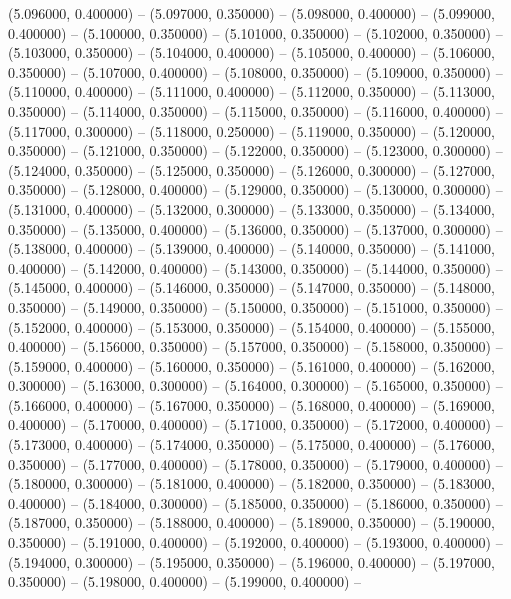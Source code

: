 (5.096000, 0.400000) -- 
(5.097000, 0.350000) -- 
(5.098000, 0.400000) -- 
(5.099000, 0.400000) -- 
(5.100000, 0.350000) -- 
(5.101000, 0.350000) -- 
(5.102000, 0.350000) -- 
(5.103000, 0.350000) -- 
(5.104000, 0.400000) -- 
(5.105000, 0.400000) -- 
(5.106000, 0.350000) -- 
(5.107000, 0.400000) -- 
(5.108000, 0.350000) -- 
(5.109000, 0.350000) -- 
(5.110000, 0.400000) -- 
(5.111000, 0.400000) -- 
(5.112000, 0.350000) -- 
(5.113000, 0.350000) -- 
(5.114000, 0.350000) -- 
(5.115000, 0.350000) -- 
(5.116000, 0.400000) -- 
(5.117000, 0.300000) -- 
(5.118000, 0.250000) -- 
(5.119000, 0.350000) -- 
(5.120000, 0.350000) -- 
(5.121000, 0.350000) -- 
(5.122000, 0.350000) -- 
(5.123000, 0.300000) -- 
(5.124000, 0.350000) -- 
(5.125000, 0.350000) -- 
(5.126000, 0.300000) -- 
(5.127000, 0.350000) -- 
(5.128000, 0.400000) -- 
(5.129000, 0.350000) -- 
(5.130000, 0.300000) -- 
(5.131000, 0.400000) -- 
(5.132000, 0.300000) -- 
(5.133000, 0.350000) -- 
(5.134000, 0.350000) -- 
(5.135000, 0.400000) -- 
(5.136000, 0.350000) -- 
(5.137000, 0.300000) -- 
(5.138000, 0.400000) -- 
(5.139000, 0.400000) -- 
(5.140000, 0.350000) -- 
(5.141000, 0.400000) -- 
(5.142000, 0.400000) -- 
(5.143000, 0.350000) -- 
(5.144000, 0.350000) -- 
(5.145000, 0.400000) -- 
(5.146000, 0.350000) -- 
(5.147000, 0.350000) -- 
(5.148000, 0.350000) -- 
(5.149000, 0.350000) -- 
(5.150000, 0.350000) -- 
(5.151000, 0.350000) -- 
(5.152000, 0.400000) -- 
(5.153000, 0.350000) -- 
(5.154000, 0.400000) -- 
(5.155000, 0.400000) -- 
(5.156000, 0.350000) -- 
(5.157000, 0.350000) -- 
(5.158000, 0.350000) -- 
(5.159000, 0.400000) -- 
(5.160000, 0.350000) -- 
(5.161000, 0.400000) -- 
(5.162000, 0.300000) -- 
(5.163000, 0.300000) -- 
(5.164000, 0.300000) -- 
(5.165000, 0.350000) -- 
(5.166000, 0.400000) -- 
(5.167000, 0.350000) -- 
(5.168000, 0.400000) -- 
(5.169000, 0.400000) -- 
(5.170000, 0.400000) -- 
(5.171000, 0.350000) -- 
(5.172000, 0.400000) -- 
(5.173000, 0.400000) -- 
(5.174000, 0.350000) -- 
(5.175000, 0.400000) -- 
(5.176000, 0.350000) -- 
(5.177000, 0.400000) -- 
(5.178000, 0.350000) -- 
(5.179000, 0.400000) -- 
(5.180000, 0.300000) -- 
(5.181000, 0.400000) -- 
(5.182000, 0.350000) -- 
(5.183000, 0.400000) -- 
(5.184000, 0.300000) -- 
(5.185000, 0.350000) -- 
(5.186000, 0.350000) -- 
(5.187000, 0.350000) -- 
(5.188000, 0.400000) -- 
(5.189000, 0.350000) -- 
(5.190000, 0.350000) -- 
(5.191000, 0.400000) -- 
(5.192000, 0.400000) -- 
(5.193000, 0.400000) -- 
(5.194000, 0.300000) -- 
(5.195000, 0.350000) -- 
(5.196000, 0.400000) -- 
(5.197000, 0.350000) -- 
(5.198000, 0.400000) -- 
(5.199000, 0.400000) -- 
